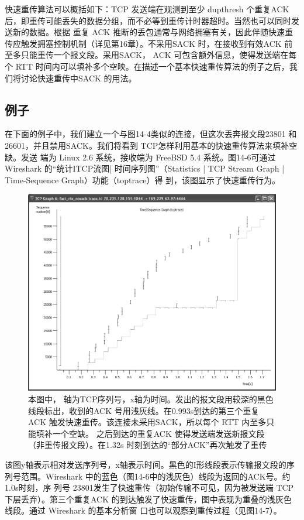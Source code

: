 快速重传算法可以概括如下：TCP 发送端在观测到至少 dupthresh 个重复ACK 后，即重传可能丢失的数据分组，而不必等到重传计时器超时。当然也可以同时发送新的数据。根据
重复 ACK 推断的丢包通常与网络拥塞有关，因此伴随快速重传应触发拥塞控制机制（详见第16章）。不采用SACK 时，在接收到有效ACK 前至多只能重传一个报文段。采用SACK，
ACK 可包含额外信息，使得发送端在每个 RTT 时间内可以填补多个空映。在描述一个基本快速重传算法的例子之后，我们将讨论快速重传中SACK 的用法。

\subsection{例子}
在下面的例子中，我们建立一个与图14-4类似的连接，但这次丢奔报文段23801 和26601，并且禁用SACK。我们将看到 TCP怎样利用基本的快速重传算法来填补空缺。发送
端为 Linux 2.6 系统，接收端为 FreeBSD 5.4 系统。图14-6可通过 Wireshark 的“统计ITCP流图| 时间序列图”（Statistics | TCP Stream Graph | Time-Sequence Graph）功能（toptrace）得
到，该图显示了快速重传行为。


\begin{figure}[!htb]
	\includegraphics[width=1.0\textwidth]{imgs/14/14-6.png}
	\caption{本图中， 轴为TCP序列号，x轴为时间。发出的报文段用较深的黑色线段标出，收到的ACK 号用浅灰线。在0.993s到达的第三个重复 ACK 触发快速重传。该连接未采用SACK，所以每个 RTT 内至多只能填补一个空缺。
    之后到达的重复ACK 使得发送端发送新报文段（非重传报文段）。在1.32s 时刻到达的“部分ACK”再次触发了重传}
\end{figure}


该图y轴表示相对发送序列号，x轴表示时间。黑色的I形线段表示传输报文段的序列号范围。Wireshark 中的蓝色（图14-6中的浅灰色）线段为返回的ACK号。约1.0s时刻，序
列号 23801发生了快速重传（初始传输不可见，因为被发送端 TCP 下层丢弃）。第三个重复ACK 的到达触发了快速重传，图中表现为重叠的浅灰色线段。通过 Wireshark 的基本分析窗
口也可以观察到重传过程（见图14-7）。

